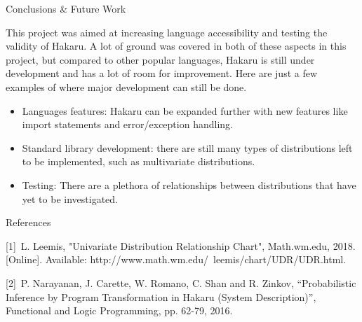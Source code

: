 \documentclass[22pt]{beamer}
\begin{document}
\begin{frame}[fragile]
\begin{textblock}{5}
\begin{block}{\Large{Conclusions \& Future Work}}
\scriptsize{This project was aimed at increasing language accessibility and testing the validity of Hakaru. A lot of ground was covered in both of these aspects in this project, but compared to other popular languages, Hakaru is still under development and has a lot of room for improvement. Here are just a few examples of where major development can still be done.

\begin{itemize}
    \item Languages features: Hakaru can be expanded further with new features like import statements and error/exception handling. 
    \item Standard library development: there are still many types of  distributions left to be implemented, such as multivariate distributions.
    \item Testing: There are a plethora of relationships between distributions that have yet to be investigated.  
\end{itemize}

}

\end{block}


\begin{block}{\Large{References}}

\scriptsize{[1]~L. Leemis, "Univariate Distribution Relationship Chart", Math.wm.edu, 2018. [Online]. Available: http://www.math.wm.edu/~leemis/chart/UDR/UDR.html. 

[2]~P. Narayanan, J. Carette, W. Romano, C. Shan and R. Zinkov, “Probabilistic Inference by Program Transformation in Hakaru (System Description)”, Functional and Logic Programming, pp. 62-79, 2016.}


\end{block}


% 

\end{textblock}
\end{frame}
\end{document}
